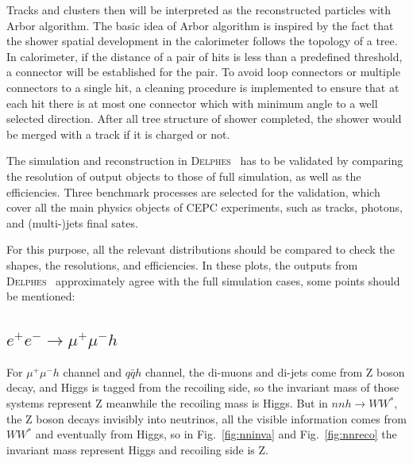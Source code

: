 \documentclass[a4paper,10pt,twoside]{cpc-hepnp}
\begin{document}
Tracks and clusters then will be interpreted as the reconstructed particles with Arbor algorithm\cite{ref:arbor}. The basic idea of Arbor algorithm is inspired by the fact that the shower spatial development  in the calorimeter follows the topology of a tree. In calorimeter, if the distance of a pair of hits is less than a predefined threshold, a connector will be established for the pair. To avoid loop connectors or multiple connectors to a single hit, a cleaning procedure is implemented to ensure that at each hit there is at most one connector which with minimum angle to a well selected direction. After all tree structure of shower completed, the shower would be merged with a track if it is charged or not.
\fi

The simulation and reconstruction in {\textsc{Delphes}~} has to be validated by comparing the resolution of output objects to those of full simulation, as well as the efficiencies. Three  benchmark processes are selected for the validation, which cover all the main physics objects of CEPC experiments, such as tracks, photons, and (multi-)jets final sates.   

For this purpose, all the relevant distributions should be compared to check the shapes, the resolutions, and efficiencies.    In these plots, the outputs from {\textsc{Delphes}~} approximately agree with the full simulation cases, some points should be mentioned:

\subsection{$e^+e^-\to \mu^+\mu^-h$} For $\mu^+\mu^-h$ channel and $q\bar{q}h$ channel, the di-muons and di-jets come from Z boson decay, and Higgs is tagged from the recoiling side, so the invariant mass of those systems represent Z meanwhile the recoiling mass is Higgs. But in $nnh\to WW^*$, the Z boson decays invisibly into neutrinos, all the visible information comes from $WW^*$ and eventually from Higgs, so in Fig.~\ref{fig:nninva} and Fig.~\ref{fig:nnreco} the invariant mass represent Higgs and recoiling side is Z.
\end{document}
